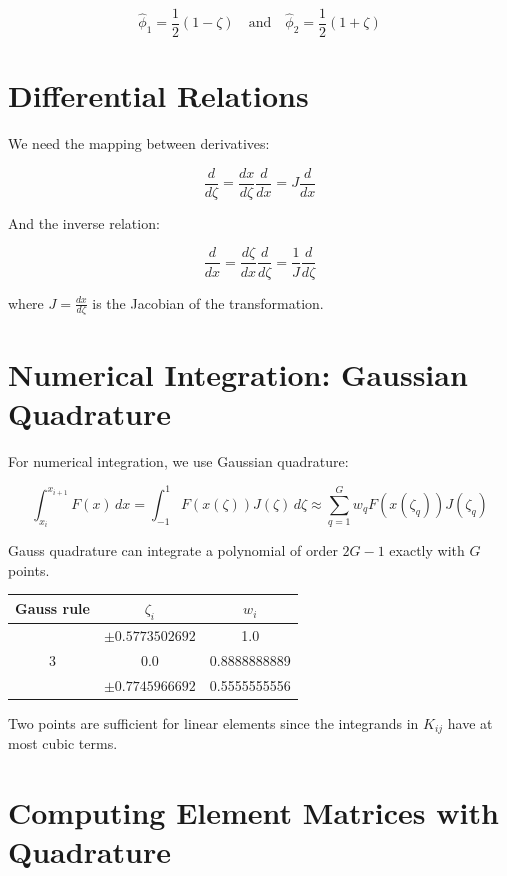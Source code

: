 \documentclass[
  11pt,
  a4paper,
]{scrbook}
\begin{document}
\[\hat{\phi}_1 = \frac{1}{2}(1-\zeta) \quad \text{and} \quad \hat{\phi}_2 = \frac{1}{2}(1+\zeta)\]

\section{Differential Relations}\label{differential-relations}

We need the mapping between derivatives:

\[\frac{d}{d\zeta} = \frac{dx}{d\zeta}\frac{d}{dx} = J \frac{d}{dx}\]

And the inverse relation:

\[\frac{d}{dx} = \frac{d\zeta}{dx}\frac{d}{d\zeta} = \frac{1}{J}\frac{d}{d\zeta}\]

where \(J = \frac{dx}{d\zeta}\) is the Jacobian of the transformation.

\section{Numerical Integration: Gaussian
Quadrature}\label{numerical-integration-gaussian-quadrature}

For numerical integration, we use Gaussian quadrature:

\[\int_{x_i}^{x_{i+1}} F(x) \, dx = \int_{-1}^1 F(x(\zeta)) J(\zeta) \, d\zeta \approx \sum_{q=1}^G w_q F(x(\zeta_q)) J(\zeta_q)\]

Gauss quadrature can integrate a polynomial of order \(2G-1\) exactly
with \(G\) points.

\begin{longtable}[]{@{}ccc@{}}
\toprule\noalign{}
Gauss rule & \(\zeta_i\) & \(w_i\) \\
\midrule\noalign{}
\endhead
\bottomrule\noalign{}
\endlastfoot
2 & \(\pm 0.5773502692\) & 1.0 \\
3 & 0.0 & 0.8888888889 \\
& \(\pm 0.7745966692\) & 0.5555555556 \\
\end{longtable}

Two points are sufficient for linear elements since the integrands in
\(K_{ij}\) have at most cubic terms.

\section{Computing Element Matrices with
Quadrature}\label{computing-element-matrices-with-quadrature}
\end{document}
